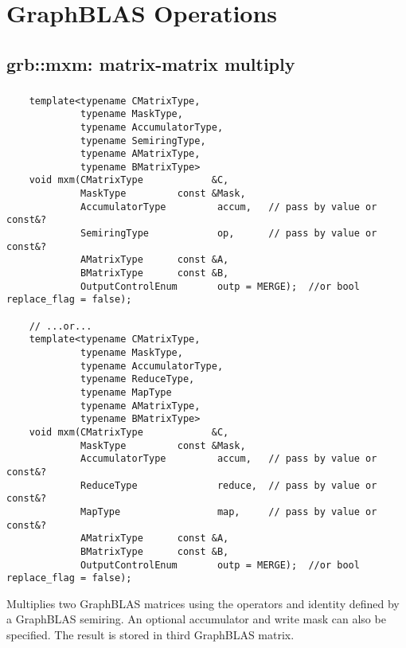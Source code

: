\chapter{GraphBLAS Operations}
\label{Ch:Operations}

\section{{\sf grb::mxm}: matrix-matrix multiply}

\paragraph{\syntax}

\begin{verbatim}
    template<typename CMatrixType,
             typename MaskType,
             typename AccumulatorType,
             typename SemiringType,
             typename AMatrixType,
             typename BMatrixType>
    void mxm(CMatrixType            &C,
             MaskType         const &Mask,
             AccumulatorType         accum,   // pass by value or const&?
             SemiringType            op,      // pass by value or const&?
             AMatrixType      const &A,
             BMatrixType      const &B,
             OutputControlEnum       outp = MERGE);  //or bool replace_flag = false);

    // ...or...
    template<typename CMatrixType,
             typename MaskType,
             typename AccumulatorType,
             typename ReduceType,
             typename MapType
             typename AMatrixType,
             typename BMatrixType>
    void mxm(CMatrixType            &C,
             MaskType         const &Mask,
             AccumulatorType         accum,   // pass by value or const&?
             ReduceType              reduce,  // pass by value or const&?
             MapType                 map,     // pass by value or const&?
             AMatrixType      const &A,
             BMatrixType      const &B,
             OutputControlEnum       outp = MERGE);  //or bool replace_flag = false);
\end{verbatim}

Multiplies two GraphBLAS matrices using the operators and identity defined by a GraphBLAS semiring. An optional accumulator and write mask can also be specified. The result is stored in third GraphBLAS matrix.

